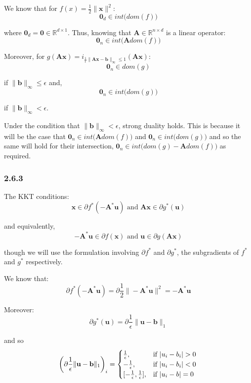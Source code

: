\documentclass[12pt]{article}
\begin{document}
We know that for $f(x) = \frac{1}{2}\|\textbf{x}\|^2$:
\[\textbf{0}_d \in int \big(dom(f)\big)\]

where $\textbf{0}_d = \textbf{0} \in \mathbb{R}^{d \times 1}$. Thus, knowing that $\textbf{A} \in \mathbb{R}^{n\times d}$ is a linear operator:
\[\textbf{0}_n \in int \big(\textbf{A} dom(f)\big)\]

Moreover, for $g(\textbf{Ax}) =  i_{\frac{1}{\epsilon}\|\textbf{Ax} - \textbf{b}\|_{\infty} \leq 1}\left(\textbf{Ax}\right)$:
\[\textbf{0}_n \in dom(g)\]

if $\|\textbf{b}\|_{\infty} \leq \epsilon$ and,
\[\textbf{0}_n \in int \big(dom(g)\big)\]

if $\|\textbf{b}\|_{\infty} < \epsilon$.

Under the condition that $\|\textbf{b}\|_{\infty} < \epsilon$, strong duality holds. This is because it will be the case that $\textbf{0}_n \in int \big(\textbf{A} dom(f)\big)$ and $\textbf{0}_n \in int \big(dom(g)\big)$ and so the same will hold for their intersection, $\textbf{0}_n \in int \big(dom(g) - \textbf{A}dom(f)\big)$ as required.

\subsubsection*{2.6.3}

The KKT conditions:
\[\textbf{x} \in \partial f^*(-\textbf{A}^*\textbf{u}) \text{ and } \textbf{Ax} \in \partial g^*(\textbf{u})\]

and equivalently,
\[-\textbf{A}^*\textbf{u} \in \partial f(\textbf{x}) \text{ and } \textbf{u} \in \partial g(\textbf{Ax})\]

though we will use the formulation involving $\partial f^*$ and $\partial g^*$, the subgradients of $f^*$ and $g^*$ respectively.

We know that:
\[\partial f^*(-\textbf{A}^*\textbf{u}) = \partial \frac{1}{2}\|-\textbf{A}^*\textbf{u}\|^2 = -\textbf{A}^*\textbf{u}\]

Moreover:
\[\partial g^*(\textbf{u}) = \partial\frac{1}{\epsilon} \| \textbf{u} - \textbf{b}\|_1 \]

and so
\[\left(\partial \frac{1}{\epsilon}\| \textbf{u} - \textbf{b}\|_1\right)_i = \begin{cases}
      \frac{1}{\epsilon}, &  \text{if } | u_i - b_i| > 0 \\
      -\frac{1}{\epsilon}, &  \text{if } | u_i - b_i| < 0 \\
      [-\frac{1}{\epsilon}, \frac{1}{\epsilon}], &  \text{if } | u_i - b| = 0 \\
   \end{cases} \\
\]
\end{document}
